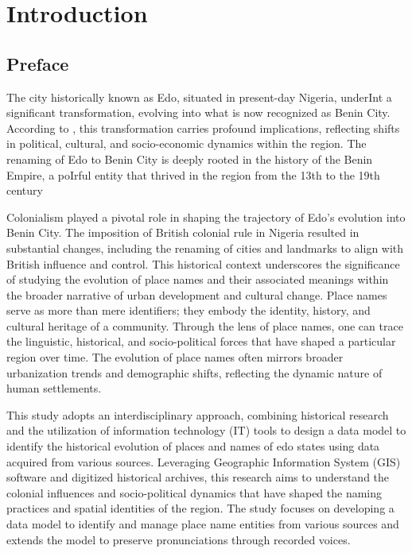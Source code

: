 \chapter{Introduction}
\section{Preface}
The city historically known as Edo, situated in present-day Nigeria, underInt a significant transformation, evolving into what is now recognized as Benin City. According to \cite{Michael2023}, this transformation carries profound implications, reflecting shifts in political, cultural, and socio-economic dynamics within the region. The renaming of Edo to Benin City is deeply rooted in the history of the Benin Empire, a poIrful entity that thrived in the region from the 13th to the 19th century\cite{egharevba1968short} 

Colonialism played a pivotal role in shaping the trajectory of Edo's evolution into Benin City. The imposition of British colonial rule in Nigeria resulted in substantial changes, including the renaming of cities and landmarks to align with British influence and control\cite{falola2008history}. This historical context underscores the significance of studying the evolution of place names and their associated meanings within the broader narrative of urban development and cultural change.
Place names serve as more than mere identifiers; they embody the identity, history, and cultural heritage of a community\cite{Gelling}. Through the lens of place names, one can trace the linguistic, historical, and socio-political forces that have shaped a particular region over time. The evolution of place names often mirrors broader urbanization trends and demographic shifts, reflecting the dynamic nature of human settlements.

This study adopts an interdisciplinary approach, combining historical research and the utilization of information technology (IT) tools to design a data model to identify the historical evolution of places and names of edo states using data acquired from various sources. Leveraging Geographic Information System (GIS) software and digitized historical archives, this research aims to understand the colonial influences and socio-political dynamics that have shaped the naming practices and spatial identities of the region. The study focuses on developing a data model to identify and manage place name entities from various sources and extends the model to preserve pronunciations through recorded voices.

